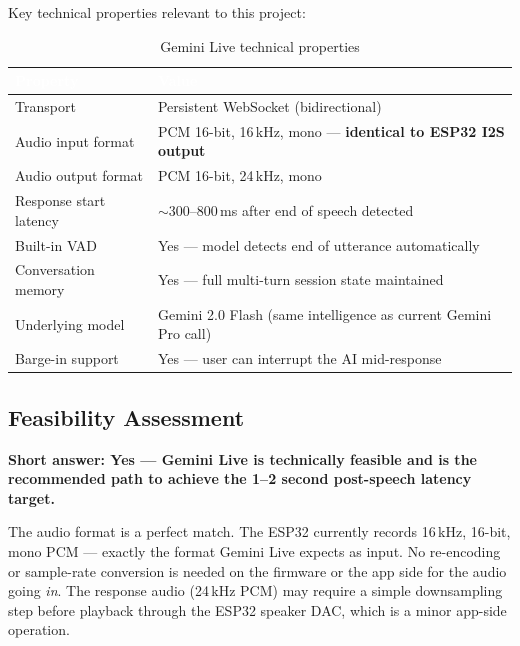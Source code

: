 \documentclass[12pt,a4paper]{article}
\begin{document}
Key technical properties relevant to this project:

\begin{table}[h!]
\centering
\renewcommand{\arraystretch}{1.3}
\begin{tabularx}{\linewidth}{|l|X|}
\hline
\rowcolor{primary}
\textcolor{white}{\textbf{Property}} & \textcolor{white}{\textbf{Value}} \\
\hline
Transport               & Persistent WebSocket (bidirectional) \\
\hline
\rowcolor{rowalt}
Audio input format      & PCM 16-bit, 16\,kHz, mono — \textbf{identical to ESP32 I2S output} \\
\hline
Audio output format     & PCM 16-bit, 24\,kHz, mono \\
\hline
\rowcolor{rowalt}
Response start latency  & $\sim$300--800\,ms after end of speech detected \\
\hline
Built-in VAD            & Yes — model detects end of utterance automatically \\
\hline
\rowcolor{rowalt}
Conversation memory     & Yes — full multi-turn session state maintained \\
\hline
Underlying model        & Gemini 2.0 Flash (same intelligence as current Gemini Pro call) \\
\hline
\rowcolor{rowalt}
Barge-in support        & Yes — user can interrupt the AI mid-response \\
\hline
\end{tabularx}
\caption{Gemini Live technical properties}
\end{table}

\subsection{Feasibility Assessment}

\textbf{Short answer: Yes — Gemini Live is technically feasible and is the recommended path
to achieve the 1--2 second post-speech latency target.}

The audio format is a perfect match. The ESP32 currently records 16\,kHz, 16-bit, mono PCM —
exactly the format Gemini Live expects as input. No re-encoding or sample-rate conversion is
needed on the firmware or the app side for the audio going \emph{in}. The response audio
(24\,kHz PCM) may require a simple downsampling step before playback through the ESP32 speaker
DAC, which is a minor app-side operation.
\end{document}

